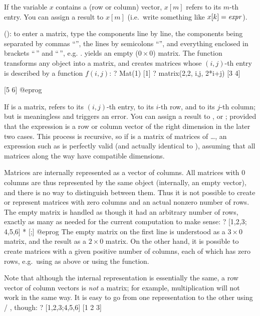 If the variable $x$ contains a (row or column) vector, $x[m]$ refers to its
$m$-th entry. You can assign a result to $x[m]$ (i.e.~write something like
$x[k]=\hbox{\it expr\/}$).

 (): to enter a matrix, type
the components line by line, the components being separated by commas
``\kbd{,}'', the lines by semicolons ``\kbd{;}'', and everything enclosed in
brackets ``\kbd{[}$\,$'' and ``$\,$\kbd{]}'', e.g. \kbd{[x,y; z,t; u,v]}.
\kbd{[;]} yields an empty ($0 \times 0$) matrix. The function 
transforms any object into a matrix, and  creates matrices
whose $(i,j)$-th entry is described by a function $f(i,j)$:
\bprog
? Mat(1)
[1]
? matrix(2,2, i,j, 2*i+j)
[3 4]

[5 6]
@eprog

If  is a matrix,  refers to its $(i,j)$-th entry, 
 to its $i$-th row, and
 to its $j$-th column; but  is meaningless and triggers
an error. You can assign a result to ,  or
; provided that the expression is a row or column vector of the
right dimension in the later two cases. This process is recursive, so if
is a matrix of matrices of \dots, an expression such as  is perfectly valid (and actually identical to ),
assuming that all matrices along the way have compatible dimensions.

 Matrices are internally represented
as a vector of columns. All matrices with $0$ columns are thus represented
by the same object (internally, an empty vector), and there is no way to
distinguish between them. Thus it is not possible to create or represent
matrices with zero columns and an actual nonzero number of rows.
The empty matrix \kbd{[;]} is handled as though it had an arbitrary number of
rows, exactly as many as needed for the current computation to make sense:
\bprog
? [1,2,3; 4,5,6] * [;]
@eprog\noindent
The empty matrix on the first line is understood as a $3\times 0$ matrix, and
the result as a $2\times 0$ matrix. On the other hand, it is possible to
create matrices with a given positive number of columns, each of which has
zero rows, e.g.~using  as above or using the  function.

Note that although the internal representation is essentially the same, a row
vector of column vectors is \emph{not} a matrix; for example, multiplication
will not work in the same way. It is easy to go from one representation to
the other using  / , though:
\bprog
? [1,2,3;4,5,6]
[1 2 3]

